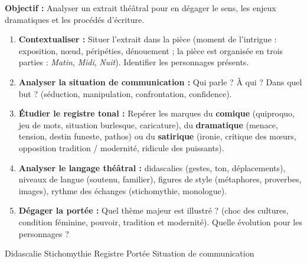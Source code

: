 \documentclass[11pt]{article}
\newcommand{\cle}[1]{{\popxbold\color{popdark}#1}}
\begin{document}
\begin{methode}
\textbf{Objectif :} Analyser un extrait théâtral pour en dégager le sens, les enjeux dramatiques et les procédés d'écriture.
\begin{enumerate}
    \item \textbf{Contextualiser :} Situer l'extrait dans la pièce (moment de l'intrigue : exposition, nœud, péripéties, dénouement ; la pièce est organisée en trois parties : \emph{Matin}, \emph{Midi}, \emph{Nuit}). Identifier les personnages présents.
    \item \textbf{Analyser la situation de communication :} Qui parle ? À qui ? Dans quel but ? (séduction, manipulation, confrontation, confidence).
    \item \textbf{Étudier le registre tonal :} Repérer les marques du \textbf{comique} (quiproquo, jeu de mots, situation burlesque, caricature), du \textbf{dramatique} (menace, tension, destin funeste, pathos) ou du \textbf{satirique} (ironie, critique des mœurs, opposition tradition / modernité, ridicule des puissants).
    \item \textbf{Analyser le langage théâtral :} didascalies (gestes, ton, déplacements), niveaux de langue (soutenu, familier), figures de style (métaphores, proverbes, images), rythme des échanges (stichomythie, monologue).
    \item \textbf{Dégager la portée :} Quel thème majeur est illustré ? (choc des cultures, condition féminine, pouvoir, tradition et modernité). Quelle évolution pour les personnages ?
\end{enumerate}
\cle{Didascalie} \cle{Stichomythie} \cle{Registre} \cle{Portée} \cle{Situation de communication}
\end{methode}
\end{document}
